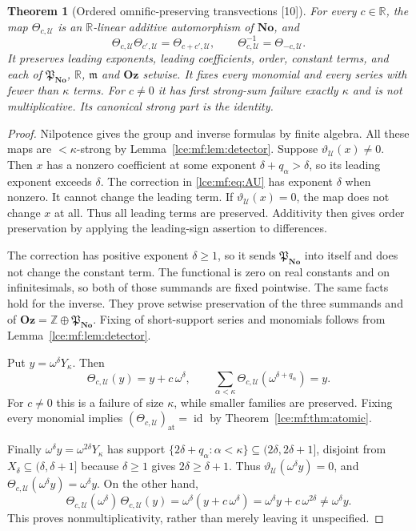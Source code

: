 \documentclass[11pt,letterpaper]{article}
\numberwithin{equation}{section}
\newtheorem{theorem}{Theorem}[section]
\theoremstyle{definition}
\theoremstyle{remark}
\newcommand{\No}{\mathbf{No}}
\newcommand{\Oz}{\mathbf{Oz}}
\newcommand{\R}{\mathbb R}
\newcommand{\Z}{\mathbb Z}
\newcommand{\infideal}{\mathfrak m}
\newcommand{\thref}[1]{Theorem~\ref{#1}}
\newcommand{\leref}[1]{Lemma~\ref{#1}}
\newcommand{\src}[1]{\textup{\textsf{\small[#1]}}}%
\newcommand{\at}{\mathrm{at}}
\newcommand{\id}{\operatorname{id}}
\begin{document}
\begin{theorem}[Ordered omnific-preserving transvections \src{10}]\label{lce:mf:thm:shear}
For every $c\in\R$, the map $\Theta_{c,\mathcal U}$ is an $\R$-linear
additive automorphism of $\No$, and
\[
 \Theta_{c,\mathcal U}\Theta_{c',\mathcal U}=\Theta_{c+c',\mathcal U},\qquad
 \Theta_{c,\mathcal U}^{-1}=\Theta_{-c,\mathcal U}.
\]
It preserves leading exponents, leading coefficients, order, constant terms,
and each of $\mathfrak P_{\No}$, $\R$, $\infideal$ and $\Oz$ setwise. It
fixes every monomial and every series with fewer than $\kappa$ terms. For
$c\ne0$ it has first strong-sum failure exactly $\kappa$ and is not
multiplicative. Its canonical strong part is the identity.
\end{theorem}
\begin{proof}
Nilpotence gives the group and inverse formulas by finite algebra. All these
maps are ${<}\kappa$-strong by \leref{lce:mf:lem:detector}. Suppose
$\vartheta_{\mathcal U}(x)\ne0$. Then $x$ has a nonzero coefficient at some
exponent $\delta+q_\alpha>\delta$, so its leading exponent exceeds $\delta$.
The correction in \eqref{lce:mf:eq:AU} has exponent $\delta$ when nonzero.
It cannot change the leading term. If $\vartheta_{\mathcal U}(x)=0$, the
map does not change $x$ at all. Thus all leading terms are preserved.
Additivity then gives order preservation by applying the leading-sign
assertion to differences.

The correction has positive exponent $\delta\ge1$, so it sends $\mathfrak
P_{\No}$ into itself and does not change the constant term. The functional
is zero on real constants and on infinitesimals, so both of those summands
are fixed pointwise. The same facts hold for the inverse. They prove setwise
preservation of the three summands and of $\Oz=\Z\oplus\mathfrak P_{\No}$.
Fixing of short-support series and monomials follows from
\leref{lce:mf:lem:detector}.

Put $y=\omega^\delta Y_\kappa$. Then
\[
 \Theta_{c,\mathcal U}(y)=y+c\,\omega^\delta,\qquad
 \sum_{\alpha<\kappa}\Theta_{c,\mathcal U}(\omega^{\delta+q_\alpha})=y.
\]
For $c\ne0$ this is a failure of size $\kappa$, while smaller families are
preserved. Fixing every monomial implies $(\Theta_{c,\mathcal
U})_{\at}=\id$ by \thref{lce:mf:thm:atomic}.

Finally $\omega^\delta y=\omega^{2\delta}Y_\kappa$ has support
$\{2\delta+q_\alpha:\alpha<\kappa\}\subseteq(2\delta,2\delta+1]$, disjoint
from $X_\delta\subseteq(\delta,\delta+1]$ because $\delta\ge1$ gives
$2\delta\ge\delta+1$. Thus $\vartheta_{\mathcal U}(\omega^\delta y)=0$, and
$\Theta_{c,\mathcal U}(\omega^\delta y)=\omega^\delta y$. On the other hand,
\[
 \Theta_{c,\mathcal U}(\omega^\delta)\,\Theta_{c,\mathcal U}(y)
 =\omega^\delta(y+c\,\omega^\delta)=\omega^\delta y+c\,\omega^{2\delta}
 \ne\omega^\delta y.
\]
This proves nonmultiplicativity, rather than merely leaving it
unspecified.
\end{proof}
\end{document}
